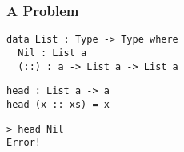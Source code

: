 \begin{frame}[fragile]
\frametitle{A Problem}

\begin{lstlisting}[frame=single]
data List : Type -> Type where
  Nil : List a
  (::) : a -> List a -> List a
\end{lstlisting}

\begin{lstlisting}[frame=single]
head : List a -> a
head (x :: xs) = x
\end{lstlisting}

\begin{lstlisting}[frame=single]
> head Nil
Error!
\end{lstlisting}

\end{frame}
